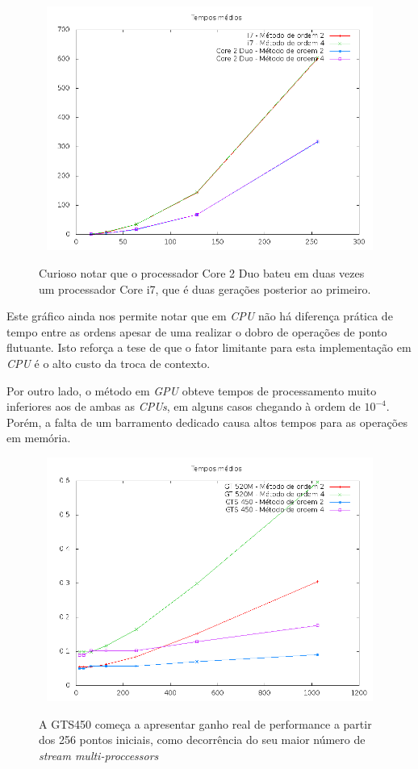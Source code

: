   \begin{figure}[!h]
    \begin{center}
       \includegraphics[width=120mm, height=80mm]{images/cpu-means.png}
       \label{fig:cpu-means}
       \caption{Curioso notar que o processador Core 2 Duo bateu em duas vezes um processador Core i7, que é duas gerações posterior ao primeiro.}
    \end{center}
  \end{figure}
  
  Este gráfico ainda nos permite notar que em \textit{CPU} não há diferença prática de tempo entre as ordens apesar de uma realizar o dobro de operações de ponto flutuante. Isto reforça a tese de que o fator limitante para esta implementação em \textit{CPU} é o alto custo da troca de contexto.
  
  \newpage
  Por outro lado, o método em \textit{GPU} obteve tempos de processamento muito inferiores aos de ambas as \textit{CPUs}, em alguns casos chegando à ordem de $10^{-4}$. Porém, a falta de um barramento dedicado causa altos tempos para as operações em memória.
  
  \begin{figure}[!h]
    \begin{center}
       \includegraphics[width=120mm, height=80mm]{images/gpu-means-double.png}
       \label{fig:gpu-means-double}
       \caption{A GTS450 começa a apresentar ganho real de performance a partir dos 256 pontos iniciais, como decorrência do seu maior número de \textit{stream multi-proccessors}}
    \end{center}
  \end{figure}
  
